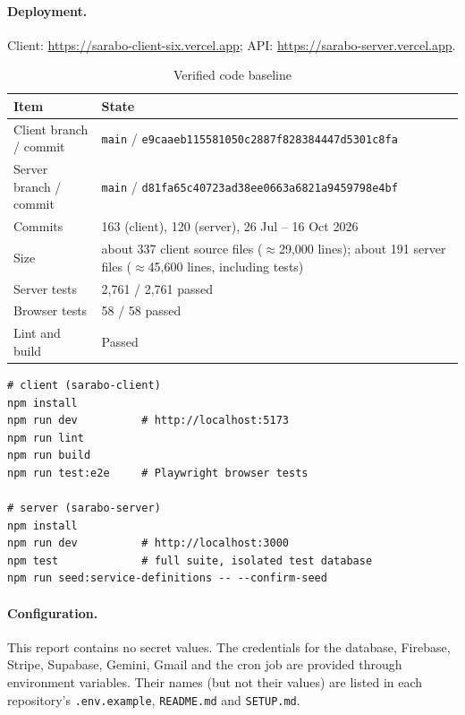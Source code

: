 \documentclass{standalone}
\begin{document}
\paragraph*{Deployment.} Client: \url{https://sarabo-client-six.vercel.app}; API: \url{https://sarabo-server.vercel.app}.

\begin{table}[htbp]
\centering
\caption{Verified code baseline}
\label{tab:baseline}
\small
\begin{tabularx}{\textwidth}{@{}p{4.2cm}X@{}}
\toprule
\textbf{Item} & \textbf{State} \\
\midrule
Client branch / commit & \texttt{main} / \texttt{e9caaeb115581050c2887f828384447d5301c8fa} \\
Server branch / commit & \texttt{main} / \texttt{d81fa65c40723ad38ee0663a6821a9459798e4bf} \\
Commits & 163 (client), 120 (server), 26 Jul -- 16 Oct 2026 \\
Size & about 337 client source files ($\approx$29,000 lines); about 191 server files ($\approx$45,600 lines, including tests) \\
Server tests & 2,761 / 2,761 passed \\
Browser tests & 58 / 58 passed \\
Lint and build & Passed \\
\bottomrule
\end{tabularx}
\end{table}

\begin{lstlisting}[caption={Development commands},label={lst:commands}]
# client (sarabo-client)
npm install
npm run dev          # http://localhost:5173
npm run lint
npm run build
npm run test:e2e     # Playwright browser tests

# server (sarabo-server)
npm install
npm run dev          # http://localhost:3000
npm test             # full suite, isolated test database
npm run seed:service-definitions -- --confirm-seed
\end{lstlisting}

\paragraph*{Configuration.} This report contains no secret values. The credentials for the database, Firebase, Stripe, Supabase, Gemini, Gmail and the cron job are provided through environment variables. Their names (but not their values) are listed in each repository's \texttt{.env.example}, \texttt{README.md} and \texttt{SETUP.md}.
\end{document}
